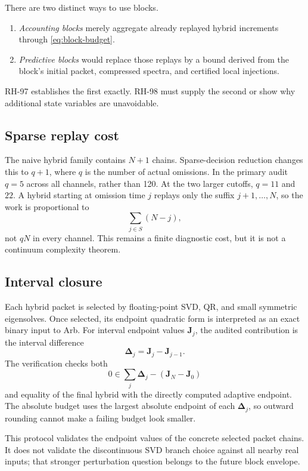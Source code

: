 \documentclass[11pt]{article}
\theoremstyle{definition}
\theoremstyle{remark}
\begin{document}
There are two distinct ways to use blocks.
\begin{enumerate}[leftmargin=2em]
\item \emph{Accounting blocks} merely aggregate already replayed hybrid
increments through \eqref{eq:block-budget}.
\item \emph{Predictive blocks} would replace those replays by a bound derived
from the block's initial packet, compressed spectra, and certified local
injections.
\end{enumerate}
RH-97 establishes the first exactly.  RH-98 must supply the second or show
why additional state variables are unavoidable.

\subsection{Sparse replay cost}

The naive hybrid family contains $N+1$ chains.  Sparse-decision reduction
changes this to $q+1$, where $q$ is the number of actual omissions.  In the
primary audit $q=5$ across all channels, rather than 120.  At the two larger
cutoffs, $q=11$ and $22$.  A hybrid starting at omission time $j$ replays only
the suffix $j+1,\ldots,N$, so the work is proportional to
\[
 \sum_{j\in S}(N-j),
\]
not $qN$ in every channel.  This remains a finite diagnostic cost, but it is
not a continuum complexity theorem.

\subsection{Interval closure}

Each hybrid packet is selected by floating-point SVD, QR, and small symmetric
eigensolves.  Once selected, its endpoint quadratic form is interpreted as an
exact binary input to Arb.  For interval endpoint values
$\boldsymbol J_j$, the audited contribution is the interval difference
\[
 \boldsymbol\Delta_j=\boldsymbol J_j-\boldsymbol J_{j-1}.
\]
The verification checks both
\[
 0\in
 \sum_j\boldsymbol\Delta_j-
 (\boldsymbol J_N-\boldsymbol J_0)
\]
and equality of the final hybrid with the directly computed adaptive
endpoint.  The absolute budget uses the largest absolute endpoint of each
$\boldsymbol\Delta_j$, so outward rounding cannot make a failing budget look
smaller.

This protocol validates the endpoint values of the concrete selected packet
chains.  It does not validate the discontinuous SVD branch choice against all
nearby real inputs; that stronger perturbation question belongs to the future
block envelope.
\end{document}
